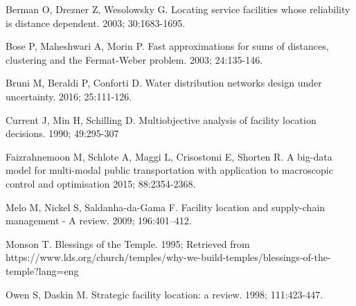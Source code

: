 \documentclass[twoside,twocolumn]{article}
\begin{document}

\begin{thebibliography}{99}

Berman O, Drezner Z, Wesolowsky G.
\newblock Locating service facilities whose reliability is distance dependent.
 2003; 30:1683-1695.

Bose P, Maheshwari A, Morin P.
\newblock Fast approximations for sums of distances, clustering and the Fermat-Weber problem.
 2003; 24:135-146.

Bruni M, Beraldi P, Conforti D.
\newblock Water distribution networks design under uncertainty.
 2016; 25:111-126.

Current J, Min H, Schilling D.
\newblock Multiobjective analysis of facility location decisions.
 1990; 49:295-307

Faizrahnemoon M, Schlote A, Maggi L, Crisostomi E, Shorten R.
\newblock A big-data model for multi-modal public transportation with application to macroscopic control and optimisation
 2015; 88:2354-2368.

Melo M, Nickel S, Saldanha-da-Gama F.
\newblock Facility location and supply-chain management - A review.
  2009; 196:401--412.

Monson T.
\newblock Blessings of the Temple. 1995;
\newblock Retrieved from https://www.lds.org/church/temples/why-we-build-temples/blessings-of-the-temple?lang=eng

Owen S, Daskin M.
\newblock Strategic facility location: a review.
 1998; 111:423-447.

\end{thebibliography}
\end{document}
